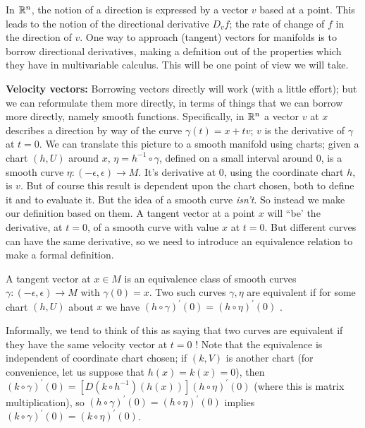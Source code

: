 \ssk

In ${\Bbb R}^n$, the notion of a direction is expressed by a vector $v$ based at a point. This leads
to the notion of the directional derivative $D_vf$; the rate of change of $f$ in the direction of
$v$. One way to approach (tangent) vectors for manifolds is to borrow directional derivatives,
making a defnition out of the properties which they have in multivariable calculus. This
will be one point of view we will take. 



{\bf Velocity vectors:} Borrowing vectors directly will work (with a little effort); but we can
reformulate them more directly, in terms of things that we can borrow more directly, namely 
smooth functions. Specifically,
in ${\Bbb R}^n$ a vector $v$ at $x$ describes a direction by way of the curve $\gamma(t) = 
x+tv$; $v$ is the derivative of $\gamma$ at $t=0$. We can translate this picture to a smooth
manifold using charts; given a chart $(h,U)$ around $x$, $\eta=h^{-1}\circ\gamma$, defined on 
a small interval around $0$, is a smooth curve $\eta:(-\epsilon,\epsilon)\rightarrow M$. It's
derivative at $0$, using the coordinate chart $h$, is $v$. But of course this result is dependent
upon the chart chosen, both to define it and to evaluate it. But the idea of a smooth
curve {\it isn't}. So instead we make our definition based on them. A tangent vector at a point $x$
will ``be' the derivative, at $t=0$, of a smooth curve with value $x$ at $t=0$. But different curves 
can have the same derivative, so we need to introduce an equivalence relation to make a formal definition. 

\ssk

A tangent vector at $x\in M$ is an equivalence class of smooth curves
$\gamma:(-\epsilon,\epsilon)\rightarrow M$ with $\gamma(0)=x$. Two such curves $\gamma,\eta$
are equivalent if for some chart $(h,U)$ about $x$ we have $(h\circ\gamma)^\prime(0)=(h\circ\eta)^\prime(0)$ .

\ssk 

Informally, we tend to think of this as saying that two curves are equivalent if they have the
same velocity vector at $t=0$ ! Note that the equivalence is independent of coordinate chart
chosen; if $(k,V)$ is another chart (for convenience, let us suppose that $h(x)=k(x)=0$),
then $(k\circ\gamma)^\prime(0)=[D(k\circ h^{-1})(h(x))](h\circ\eta)^\prime(0)$ 
(where this is matrix multiplication),
so $(h\circ\gamma)^\prime(0)=(h\circ\eta)^\prime(0)$ implies
$(k\circ\gamma)^\prime(0)=(k\circ\eta)^\prime(0)$.


